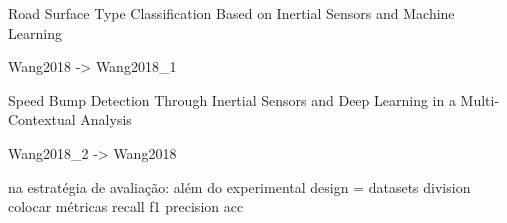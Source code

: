 Road Surface Type Classification Based on Inertial Sensors and Machine Learning

Wang2018 -> Wang2018_1

Speed Bump Detection Through Inertial Sensors and Deep Learning in a Multi-Contextual Analysis

Wang2018_2 -> Wang2018


na estratégia de avaliação:
além do experimental design = datasets division
colocar métricas recall f1 precision acc